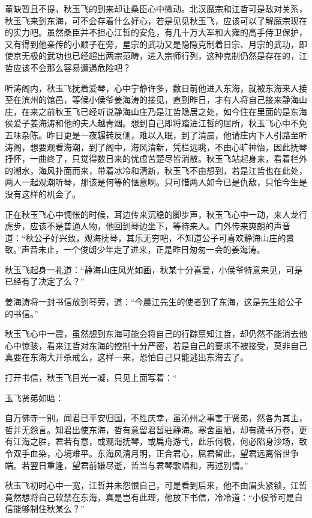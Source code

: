 董缺暂且不提，秋玉飞的到来却让桑臣心中微动。北汉魔宗和江哲可是敌对关系，秋玉飞来到东海，可不会存着什么好心，若是见见秋玉飞，应该可以了解魔宗现在的实力吧。虽然桑臣并不担心江哲的安危，有几十万大军和大雍的高手侍卫保护，又有得到他亲传的小顺子在旁，星宗的武功又是隐隐克制着日宗、月宗的武功，即使京无极的武功也已经超出两宗范畴，进入宗师行列，这种克制仍然是存在的，江哲应该不会那么容易遭遇危险吧？

听涛阁内，秋玉飞抚着爱琴，心中宁静许多，数日前他进入东海，就被东海来人接至在滨州的馆邑，等候小侯爷姜海涛的接见，直到昨日，才有人将自己接来静海山庄，在来之前秋玉飞已经听说静海山庄乃是江哲隐居之处，如今住在里面的是东海侯爱子姜海涛和他的夫人越青烟。想到自己即将踏进江哲的居所，秋玉飞心中不免五味杂陈。昨日更是一夜辗转反侧，难以入眠，到了清晨，他请庄内下人引路至听涛阁，想要观看海潮，到了阁中，海风清新，凭栏远眺，不由心旷神怡，因此抚琴抒怀，一曲终了，只觉得数日来的忧虑苦楚尽皆消散。秋玉飞站起身来，看着栏外的潮水，海风扑面而来，带着冰冷和清新，秋玉飞不由想到，若是江哲也在此处，两人一起观潮听琴，那该是何等的惬意啊。只可惜两人如今已是仇敌，只怕今生是没有这样的机会了。

正在秋玉飞心中惆怅的时候，耳边传来沉稳的脚步声，秋玉飞心中一动，来人龙行虎步，应该不是普通人物，他回到琴边坐下，等待来人。门外传来爽朗的声音道：“秋公子好兴致，观海抚琴，其乐无穷吧，不知道公子可喜欢静海山庄的景致。”声音未止，一个俊朗少年走了进来，正是昨日匆匆一会的姜海涛。

秋玉飞起身一礼道：“静海山庄风光如画，秋某十分喜爱，小侯爷特意来见，可是已经有了决定了么？”

姜海涛将一封书信放到琴旁，道：“今晨江先生的使者到了东海，这是先生给公子的书信。”

秋玉飞心中一震，虽然想到东海可能会将自己的行踪禀知江哲，却仍然不能消去他心中惊骇，看来江哲对东海的控制十分严密，若是自己的要求不被接受，莫非自己真要在东海大开杀戒么，这样一来，恐怕自己只能逃出东海去了。

打开书信，秋玉飞目光一凝，只见上面写着：“

玉飞贤弟如晤：

自万佛寺一别，闻君已平安归国，不胜庆幸，虽沁州之事害于贤弟，然各为其主，哲并无怨言。知君出使东海，哲有意留君暂驻静海。寒舍虽陋，却有藏书万卷，更有江海之胜，君若有意，或观海抚琴，或扁舟游弋，此乐何极，何必陷身沙场，致令双手血染，心境难平。东海风清月明，正合君心，屈君留此，望君远离俗世争端。若翌日重逢，望君前嫌尽逝，哲当与君琴歌唱和，再述别情。”

秋玉飞初时心中一宽，江哲并未怨恨自己，可是看到后来，他不由眉头紧锁，江哲竟然想将自己软禁在东海，真是岂有此理，他放下书信，冷冷道：“小侯爷可是自信能够制住秋某么？”

